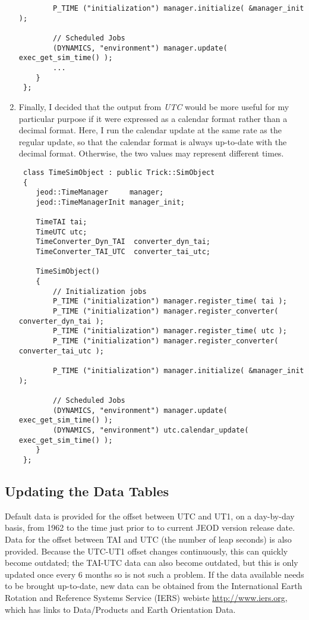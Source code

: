 \begin{enumerate}
\begin{verbatim}
        P_TIME ("initialization") manager.initialize( &manager_init );

        // Scheduled Jobs
        (DYNAMICS, "environment") manager.update( exec_get_sim_time() );
        ...
    }
 };
\end{verbatim}

\item Finally, I decided that the output from \textit{UTC} would be more
useful for my particular purpose if it were expressed as a calendar
format rather than a decimal format.  Here, I run the calendar update
at the same rate as the regular update, so that the calendar format is
always up-to-date with the decimal format.  Otherwise, the two values
may represent different times.

\begin{verbatim}
 class TimeSimObject : public Trick::SimObject
 {
    jeod::TimeManager     manager;
    jeod::TimeManagerInit manager_init;

    TimeTAI tai;
    TimeUTC utc;
    TimeConverter_Dyn_TAI  converter_dyn_tai;
    TimeConverter_TAI_UTC  converter_tai_utc;

    TimeSimObject()
    {
        // Initialization jobs
        P_TIME ("initialization") manager.register_time( tai );
        P_TIME ("initialization") manager.register_converter( converter_dyn_tai );
        P_TIME ("initialization") manager.register_time( utc );
        P_TIME ("initialization") manager.register_converter( converter_tai_utc );

        P_TIME ("initialization") manager.initialize( &manager_init );

        // Scheduled Jobs
        (DYNAMICS, "environment") manager.update( exec_get_sim_time() );
        (DYNAMICS, "environment") utc.calendar_update( exec_get_sim_time() );
    }
 };
\end{verbatim}

\end{enumerate}



\subsection{Updating the Data Tables}\label{ref:data_update}

Default data is provided for the offset between UTC and UT1, on a day-by-day basis,
from 1962 to the time just prior to to current JEOD version release date.  Data for the offset between TAI and UTC (the number of leap seconds) is also provided.  Because the UTC-UT1 offset changes continuously, this can quickly become outdated; the TAI-UTC data can also become outdated, but this is only updated once every 6 months so is not such a problem.
If the data available needs to be brought up-to-date, new data can be obtained from the International Earth Rotation and Reference Systems Service (IERS) webiste \href{http://www.iers.org}{http://www.iers.org}, which has links to Data/Products and Earth Orientation Data.

